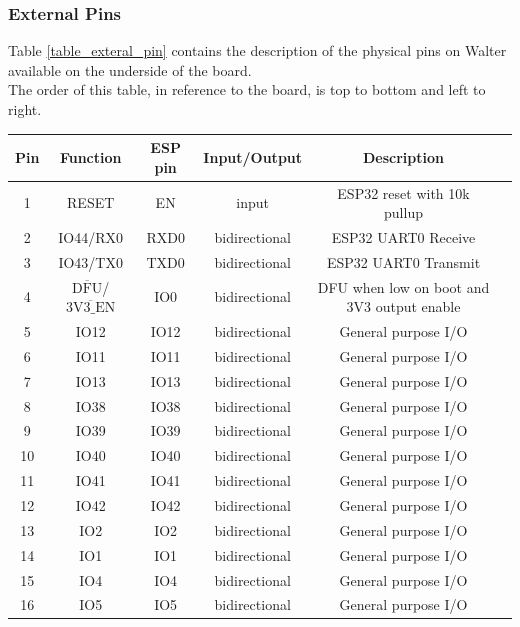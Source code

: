 \documentclass[11pt]{article}
\newcommand{\textoverline}[1]{$\overline{\mbox{#1}}$}
\begin{document}
\subsubsection{External Pins} \label{external_pins}
Table \ref{table_exteral_pin} contains the description of the physical pins on Walter available on the underside of the board. \\
The order of this table, in reference to the board, is top to bottom and left to right.\\
\renewcommand{\arraystretch}{1.5}
\begin{table}[!h]
\begin{center}
\begin{tabular}{|c|c|c|c|c|p{9.5cm}|}
\hline
{\bf Pin} & {\bf Function} & \multicolumn{1}{c|}{\bf ESP pin} & \multicolumn{1}{c|}{\bf Input/Output} & \multicolumn{1}{c|}{\bf Description} \\
\hline
\hline
1 & RESET & EN & input & ESP32 reset with 10k pullup \\
\hline
2 & IO44/RX0 & RXD0 & bidirectional & ESP32 UART0 Receive \\
\hline
3 & IO43/TX0 & TXD0 & bidirectional & ESP32 UART0 Transmit \\
\hline
4 & \textoverline{DFU}/\textoverline{3V3\_EN} & IO0 & bidirectional & DFU when low on boot and 3V3 output enable \\
\hline
5 & IO12 & IO12 & bidirectional & General purpose I/O \\
\hline
6 & IO11 & IO11 & bidirectional & General purpose I/O \\
\hline
7 & IO13 & IO13 & bidirectional & General purpose I/O \\
\hline
8 & IO38 & IO38 & bidirectional & General purpose I/O \\
\hline
9 & IO39 & IO39 & bidirectional & General purpose I/O \\
\hline
10 & IO40 & IO40 & bidirectional & General purpose I/O \\
\hline
11 & IO41 & IO41 & bidirectional & General purpose I/O \\
\hline
12 & IO42 & IO42 & bidirectional & General purpose I/O \\
\hline
13 & IO2 & IO2 & bidirectional & General purpose I/O \\
\hline
14 & IO1 & IO1 & bidirectional & General purpose I/O \\
\hline
15 & IO4 & IO4 & bidirectional & General purpose I/O \\
\hline
16 & IO5 & IO5 & bidirectional & General purpose I/O \\

\end{tabular}
\end{center}
\end{table}
\end{document}
